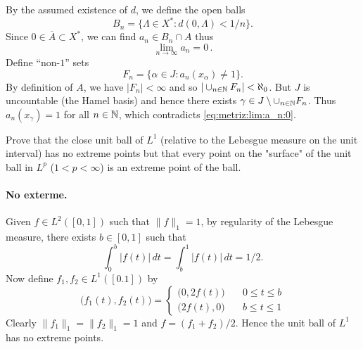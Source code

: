 \begin{enumerate}
By the assumed existence of $d$, we define the open balls
\begin{equation*}
B_n = \{\Lambda \in X^*: d(0,\Lambda) < 1/n\}.
\end{equation*}
Since \(0 \in \overline{A} \subset X^*\), we can find
\(a_n \in B_n \cap A\) thus 
\begin{equation} \label{eq:metriz:lim:a_n:0}
\lim_{n\to\infty} a_n = 0\,.
\end{equation}
Define ``non-$1$'' sets
\begin{equation*}
F_n = \{\alpha \in J: a_n(x_\alpha) \neq 1\}.
\end{equation*}
By definition of $A$, we have \(|F_n| < \infty\)
and so \(|\cup_{n\in\mathbb{N}} F_n|< \aleph_0\).
But $J$ is uncountable (the Hamel basis) and hence there exists
\(\gamma \in J \setminus \cup_{n\in\mathbb{N}} F_n\).
Thus \(a_n(x_\gamma) = 1\) for all \(n\in\mathbb{N}\), 
which contradicts \eqref{eq:metriz:lim:a_n:0}.


\begin{excopy}
Prove that the close unit ball of \(L^1\) (relative to the Lebesgue measure
on the unit interval) has no extreme points but that every point on the
"surface" of the unit ball in \(L^p\) (\(1<p<\infty\)) is an extreme
point of the ball.
\end{excopy}

\paragraph{No exterme.}
Given \(f\in L^2([0,1])\) such that \(\|f\|_1 = 1\),
by regularity of the Lebesgue measure, there exists \(b\in[0,1]\)
such that
\begin{equation*}
\int_0^b |f(t)|\,dt = \int_b^1 |f(t)|\,dt = 1/2.
\end{equation*}
Now define \(f_1,f_2\in L^1([0.1])\) by
\begin{equation}  \label{eq:f1f2:conv}
\bigl(f_1(t),f_2(t)\bigr) =
\left\{
\begin{array}{ll}
\bigl(0,2f(t)\bigr) \quad & 0 \leq t \leq b \\
\bigl(2f(t),0\bigr) \quad & b \leq t \leq 1
\end{array}
\right.
\end{equation}
Clearly \(\|f_1\|_1 = \|f_2\|_1 = 1\)
and \(f = (f_1 + f_2)/2\). Hence the unit ball of \(L^1\)
has no extreme points.


\end{enumerate}
